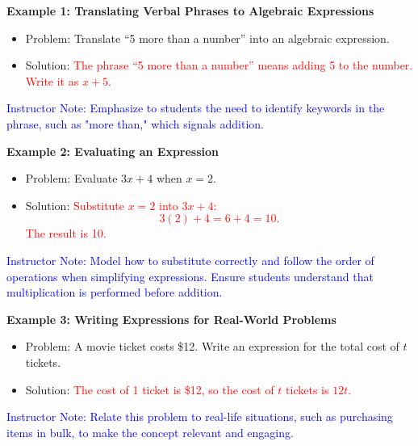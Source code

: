 \documentclass[12pt]{article}
\begin{document}
\begin{tcolorbox}[colframe=black!60, colback=white, 
coltitle=black, colbacktitle=black!15, fonttitle=\bfseries\Large, 
title=Examples, halign title=center, left=10pt, right=10pt, top=10pt, bottom=15pt]
\textbf{Example 1: Translating Verbal Phrases to Algebraic Expressions}
\begin{itemize}
    \item Problem: Translate “5 more than a number” into an algebraic expression.
    \item Solution: \textcolor{red}{The phrase “5 more than a number” means adding 5 to the number. Write it as \( x + 5 \).}
\end{itemize}
\textcolor{blue}{Instructor Note: Emphasize to students the need to identify keywords in the phrase, such as "more than," which signals addition.}

\textbf{Example 2: Evaluating an Expression}
\begin{itemize}
    \item Problem: Evaluate \( 3x + 4 \) when \( x = 2 \).
    \item Solution: \textcolor{red}{Substitute \( x = 2 \) into \( 3x + 4 \): 
    \[
    3(2) + 4 = 6 + 4 = 10.
    \]
    The result is 10.}
\end{itemize}
\textcolor{blue}{Instructor Note: Model how to substitute correctly and follow the order of operations when simplifying expressions. Ensure students understand that multiplication is performed before addition.}

\textbf{Example 3: Writing Expressions for Real-World Problems}
\begin{itemize}
    \item Problem: A movie ticket costs \$12. Write an expression for the total cost of \( t \) tickets.
    \item Solution: \textcolor{red}{The cost of 1 ticket is \$12, so the cost of \( t \) tickets is \( 12t \).}
\end{itemize}
\textcolor{blue}{Instructor Note: Relate this problem to real-life situations, such as purchasing items in bulk, to make the concept relevant and engaging.}
\end{tcolorbox}
\end{document}
